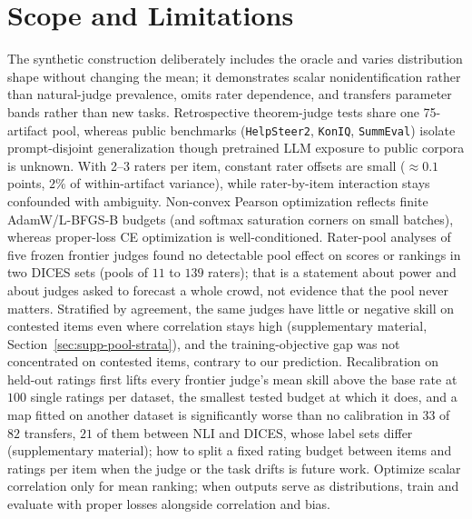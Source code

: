 \section{Scope and Limitations}
The synthetic construction deliberately includes the oracle and varies distribution shape without changing the mean; it demonstrates scalar nonidentification rather than natural-judge prevalence, omits rater dependence, and transfers parameter bands rather than new tasks. Retrospective theorem-judge tests share one 75-artifact pool, whereas public benchmarks (\texttt{HelpSteer2}, \texttt{KonIQ}, \texttt{SummEval}) isolate prompt-disjoint generalization though pretrained LLM exposure to public corpora is unknown.
With 2--3 raters per item, constant rater offsets are small ($\approx 0.1$ points, $2\%$ of within-artifact variance), while rater-by-item interaction stays confounded with ambiguity. Non-convex Pearson optimization reflects finite AdamW/L-BFGS-B budgets (and softmax saturation corners on small batches), whereas proper-loss CE optimization is well-conditioned. Rater-pool analyses of five frozen frontier judges found no detectable pool effect on scores or rankings in two DICES sets (pools of $11$ to $139$ raters); that is a statement about power and about judges asked to forecast a whole crowd, not evidence that the pool never matters.
Stratified by agreement, the same judges have little or negative skill on contested items even where correlation stays high (supplementary material\ifsupplementary{}, Section~\ref{sec:supp-pool-strata}\fi), and the training-objective gap was not concentrated on contested items, contrary to our prediction. Recalibration on held-out ratings first lifts every frontier judge's mean skill above the base rate at $100$ single ratings per dataset, the smallest tested budget at which it does, and a map fitted on another dataset is significantly worse than no calibration in $33$ of $82$ transfers, $21$ of them between NLI and DICES, whose label sets differ (supplementary material); how to split a fixed rating budget between items and ratings per item when the judge or the task drifts is future work.
Optimize scalar correlation only for mean ranking; when outputs serve as distributions, train and evaluate with proper losses alongside correlation and bias.

